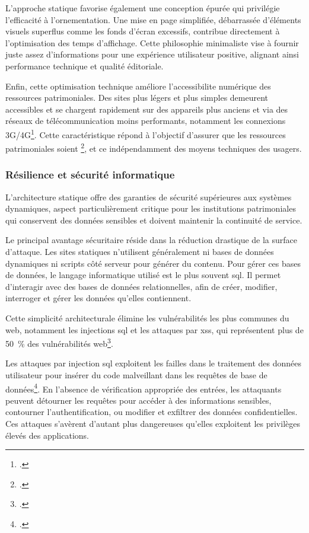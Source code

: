 L'approche statique favorise également une conception épurée qui privilégie l'efficacité à l'ornementation. Une mise en page simplifiée, débarrassée d'éléments visuels superflus comme les fonds d'écran excessifs, contribue directement à l'optimisation des temps d'affichage. Cette philosophie minimaliste vise à fournir juste assez d'informations pour une expérience utilisateur positive, alignant ainsi performance technique et qualité éditoriale.

Enfin, cette optimisation technique améliore l'\gls{accessibilite} numérique des ressources patrimoniales. Des sites plus légers et plus simples demeurent accessibles et se chargent rapidement sur des appareils plus anciens et via des réseaux de télécommunication moins performants, notamment les connexions 3G/4G\footcite{novaLowtechNumeriqueAux2020}. Cette caractéristique répond à l'objectif d'assurer que les ressources patrimoniales soient \footcite{otooleSustainableWebEcosystem2013}, et ce indépendamment des moyens techniques des usagers.

\subsubsection{Résilience et sécurité informatique}

L'architecture statique offre des garanties de sécurité supérieures aux systèmes dynamiques, aspect particulièrement critique pour les institutions patrimoniales qui conservent des données sensibles et doivent maintenir la continuité de service.

Le principal avantage sécuritaire réside dans la réduction drastique de la surface d'attaque. Les sites statiques n'utilisent généralement ni bases de données dynamiques ni scripts côté serveur pour générer du contenu. Pour gérer ces bases de données, le langage informatique utilisé est le plus souvent \gls{sql}. Il permet d'interagir avec des bases de données relationnelles, afin de créer, modifier, interroger et gérer les données qu’elles contiennent.

Cette simplicité architecturale élimine les vulnérabilités les plus communes du web, notamment les injections \gls{sql} et les attaques par \gls{xss}, qui représentent plus de 50~\% des vulnérabilités web\footcite{otooleSustainableWebEcosystem2013}.

Les attaques par injection \gls{sql} exploitent les failles dans le traitement des données utilisateur pour insérer du code malveillant dans les requêtes de base de données\footcite{clarke-saltSQLInjectionAttacks2012a}. En l'absence de vérification appropriée des entrées, les attaquants peuvent détourner les requêtes pour accéder à des informations sensibles, contourner l'authentification, ou modifier et exfiltrer des données confidentielles. Ces attaques s'avèrent d'autant plus dangereuses qu'elles exploitent les privilèges élevés des applications.

